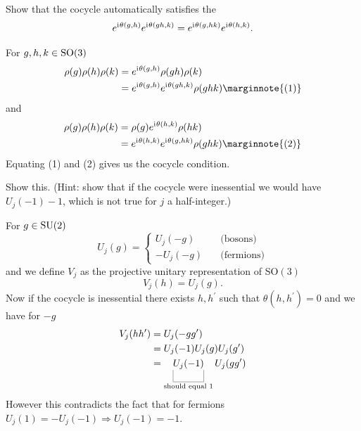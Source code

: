 \documentclass[10pt]{article}
\begin{document}
\begin{example}
	Show that the cocycle automatically satisfies the 
	$$
	e^{\mathrm{i}\mkern1mu\theta(g,h)}e^{\mathrm{i}\mkern1mu\theta(gh,k)}=e^{\mathrm{i}\mkern1mu\theta(g,hk)}e^{\mathrm{i}\mkern1mu\theta(h,k)}.
	$$
\end{example}
\sol For $g,h,k \in \text{SO}(3)$
$$
\begin{aligned}
	\rho(g)\rho(h)\rho(k) &= e^{\di\theta(g,h)}\rho(gh)\rho(k)\\
	&= e^{\di\theta(g,h)}e^{\di\theta(gh,k)}\rho(ghk)\marginnote{(1)}
\end{aligned}
$$
and
$$
\begin{aligned}
	\rho(g)\rho(h)\rho(k) &= \rho(g)e^{\di\theta(h,k)}\rho(hk)\\
	&= e^{\di\theta(h,k)}e^{\di\theta(g,hk)}\rho(ghk)\marginnote{(2)}
\end{aligned}
$$
Equating (1) and (2) gives us the cocycle condition.


\begin{example}
	Show this. (Hint: show that if the cocycle were inessential we would have $U_j(-1)-1$, which is not true for $j$ a half-integer.)
\end{example}
\sol For $g \in \text{SU}(2)$
$$
U_j(g) = \begin{cases}
	U_j(-g)\quad&\text{(bosons)}\\
	-U_j(-g)\quad&\text{(fermions)}
\end{cases}
$$
and  we define $V_j$ as the projective unitary representation of SO$(3)$
$$
	V_j(h) = U_j(g).
$$
Now if the cocycle is inessential there exists $h,h^\prime$ such that $\theta(h,h^\prime) = 0$ and we have for $-g$
$$
\begin{aligned}
	V_j(hh^\prime) &= U_j(-gg^\prime)\\
	&= U_j(-1)U_j(g)U_j(g^\prime)\\
	&= \ub{U_j(-1)}{\text{should equal 1}}U_j(gg^\prime)
\end{aligned}
$$
However this contradicts the fact that for fermions $U_j(1)=-U_j(-1) \Rightarrow U_j(-1) = -1$.
\end{document}
